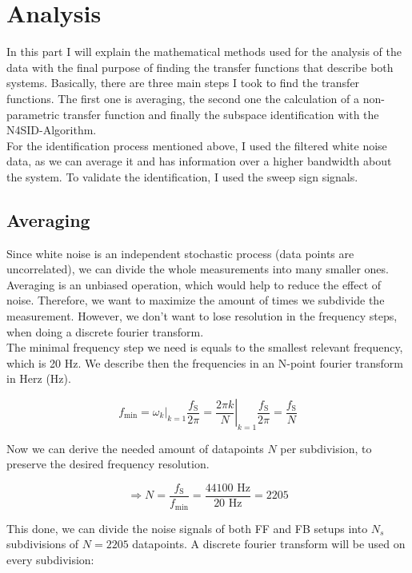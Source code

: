 \section{Analysis}

In this part I will explain the mathematical methods used for the analysis of the data with the final purpose of finding the transfer functions that describe both systems. Basically, there are three main steps I took to find the transfer functions. The first one is averaging, the second one the calculation of a non-parametric transfer function and finally the subspace identification with the N4SID-Algorithm.\\

For the identification process mentioned above, I used the filtered white noise data, as we can average it and has information over a higher bandwidth about the system. To validate the identification, I used the sweep sign signals.

\subsection{Averaging}

Since white noise is an independent stochastic process (data points are uncorrelated), we can divide the whole measurements into many smaller ones. Averaging is an unbiased operation, which would help to reduce the effect of noise. Therefore, we want to maximize the amount of times we subdivide the measurement. However, we don't want to lose resolution in the frequency steps, when doing a discrete fourier transform.\\

The minimal frequency step we need is equals to the smallest relevant frequency, which is 20 Hz. We describe then the frequencies in an N-point fourier transform in Herz (Hz).

\[ f_\text{min} =\left. \omega_k\right|_{k = 1}\frac{f_\text{S}}{2\pi} = \left. \frac{2\pi k}{N}\right|_{k = 1}\frac{f_\text{S}}{2\pi} = \frac{f_\text{S}}{N} \]

Now we can derive the needed amount of datapoints $N$ per subdivision, to preserve the desired frequency resolution.

\[\Rightarrow N = \frac{f_\text{S}}{f_\text{min}} = \frac{44100 \text{ Hz}}{20 \text{ Hz}} = 2205\]
 
This done, we can divide the noise signals of both FF and FB setups into $N_s$ subdivisions of $N = 2205$ datapoints. A discrete fourier transform will be used on every subdivision:

